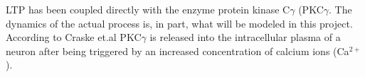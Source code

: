 \documentclass[main.tex]{subfiles}
\begin{document}
LTP has been coupled directly with the enzyme protein kinase C${\gamma}$ (PKC$\gamma$. 
The dynamics of the actual process is, in part, what will be modeled in this project. 
According to Craske et.al \cite{craske2005spines} PKC$\gamma$ is released into the intracellular plasma of a neuron after being triggered by an increased concentration of calcium ions (Ca$^{2+}$).
 
\end{document}

